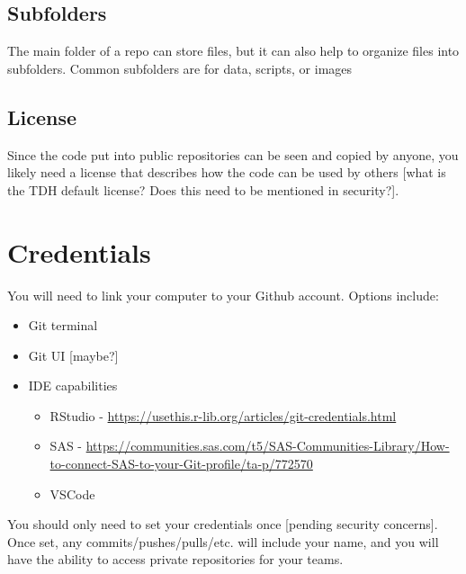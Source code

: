 \documentclass[
  letterpaper,
  DIV=11,
  numbers=noendperiod]{scrreprt}
\begin{document}
\hypertarget{subfolders}{%
\subsection{Subfolders}\label{subfolders}}

The main folder of a repo can store files, but it can also help to
organize files into subfolders. Common subfolders are for data, scripts,
or images

\hypertarget{license}{%
\subsection{License}\label{license}}

Since the code put into public repositories can be seen and copied by
anyone, you likely need a license that describes how the code can be
used by others {[}what is the TDH default license? Does this need to be
mentioned in security?{]}.

\hypertarget{credentials}{%
\section{Credentials}\label{credentials}}

You will need to link your computer to your Github account. Options
include:

\begin{itemize}
\item
  Git terminal
\item
  Git UI {[}maybe?{]}
\item
  IDE capabilities

  \begin{itemize}
  \item
    RStudio -
    \url{https://usethis.r-lib.org/articles/git-credentials.html}
  \item
    SAS -
    \url{https://communities.sas.com/t5/SAS-Communities-Library/How-to-connect-SAS-to-your-Git-profile/ta-p/772570}
  \item
    VSCode
  \end{itemize}
\end{itemize}

You should only need to set your credentials once {[}pending security
concerns{]}. Once set, any commits/pushes/pulls/etc. will include your
name, and you will have the ability to access private repositories for
your teams.
\end{document}
